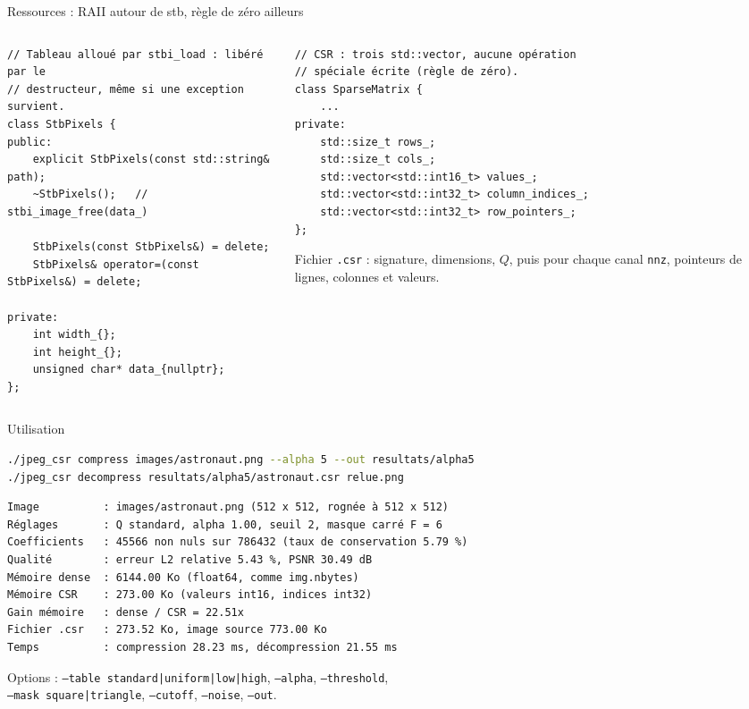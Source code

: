 \documentclass[aspectratio=169,10pt]{beamer}
\newcommand{\code}[1]{\texttt{#1}}
\begin{document}
\begin{frame}[fragile]{Ressources : RAII autour de stb, règle de zéro ailleurs}
  \begin{columns}[T]
    \begin{column}{0.51\textwidth}
\begin{lstlisting}
// Tableau alloué par stbi_load : libéré par le
// destructeur, même si une exception survient.
class StbPixels {
public:
    explicit StbPixels(const std::string& path);
    ~StbPixels();   // stbi_image_free(data_)

    StbPixels(const StbPixels&) = delete;
    StbPixels& operator=(const StbPixels&) = delete;

private:
    int width_{};
    int height_{};
    unsigned char* data_{nullptr};
};
\end{lstlisting}
    \end{column}
    \begin{column}{0.45\textwidth}
\begin{lstlisting}
// CSR : trois std::vector, aucune opération
// spéciale écrite (règle de zéro).
class SparseMatrix {
    ...
private:
    std::size_t rows_;
    std::size_t cols_;
    std::vector<std::int16_t> values_;
    std::vector<std::int32_t> column_indices_;
    std::vector<std::int32_t> row_pointers_;
};
\end{lstlisting}
      \small
      Fichier \code{.csr} : signature, dimensions, $Q$, puis pour chaque canal
      \code{nnz}, pointeurs de lignes, colonnes et valeurs.
    \end{column}
  \end{columns}
\end{frame}

\begin{frame}[fragile]{Utilisation}
\begin{lstlisting}[language=bash]
./jpeg_csr compress images/astronaut.png --alpha 5 --out resultats/alpha5
./jpeg_csr decompress resultats/alpha5/astronaut.csr relue.png
\end{lstlisting}
  \vspace{0.2em}
\begin{lstlisting}[language={}]
Image          : images/astronaut.png (512 x 512, rognée à 512 x 512)
Réglages       : Q standard, alpha 1.00, seuil 2, masque carré F = 6
Coefficients   : 45566 non nuls sur 786432 (taux de conservation 5.79 %)
Qualité        : erreur L2 relative 5.43 %, PSNR 30.49 dB
Mémoire dense  : 6144.00 Ko (float64, comme img.nbytes)
Mémoire CSR    : 273.00 Ko (valeurs int16, indices int32)
Gain mémoire   : dense / CSR = 22.51x
Fichier .csr   : 273.52 Ko, image source 773.00 Ko
Temps          : compression 28.23 ms, décompression 21.55 ms
\end{lstlisting}
  \small Options : \code{--table standard|uniform|low|high}, \code{--alpha}, \code{--threshold},\\
  \code{--mask square|triangle}, \code{--cutoff}, \code{--noise}, \code{--out}.
\end{frame}
\end{document}
